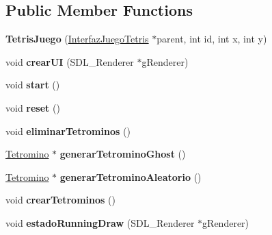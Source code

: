 \subsection*{Public Member Functions}
\begin{DoxyCompactItemize}
\item 
{\bfseries Tetris\+Juego} (\hyperlink{class_interfaz_juego_tetris}{Interfaz\+Juego\+Tetris} $\ast$parent, int id, int x, int y)\hypertarget{class_tetris_juego_a08223b09d1ae9b5eb57f05636301a6eb}{}\label{class_tetris_juego_a08223b09d1ae9b5eb57f05636301a6eb}

\item 
void {\bfseries crear\+UI} (S\+D\+L\+\_\+\+Renderer $\ast$g\+Renderer)\hypertarget{class_tetris_juego_a514937dc30a9f7bc888336a5e7052b48}{}\label{class_tetris_juego_a514937dc30a9f7bc888336a5e7052b48}

\item 
void {\bfseries start} ()\hypertarget{class_tetris_juego_a9d590db61a7cbf46eaced88e89887534}{}\label{class_tetris_juego_a9d590db61a7cbf46eaced88e89887534}

\item 
void {\bfseries reset} ()\hypertarget{class_tetris_juego_a17712a6e9e899552bb1ddc7ca2e305cc}{}\label{class_tetris_juego_a17712a6e9e899552bb1ddc7ca2e305cc}

\item 
void {\bfseries eliminar\+Tetrominos} ()\hypertarget{class_tetris_juego_a54964870a6d92ebed8ab839d0d893bd7}{}\label{class_tetris_juego_a54964870a6d92ebed8ab839d0d893bd7}

\item 
\hyperlink{class_tetromino}{Tetromino} $\ast$ {\bfseries generar\+Tetromino\+Ghost} ()\hypertarget{class_tetris_juego_a922b9d4649c4558d18227fe16337364d}{}\label{class_tetris_juego_a922b9d4649c4558d18227fe16337364d}

\item 
\hyperlink{class_tetromino}{Tetromino} $\ast$ {\bfseries generar\+Tetromino\+Aleatorio} ()\hypertarget{class_tetris_juego_ace1b43b10663450a4cba22175b65b4d1}{}\label{class_tetris_juego_ace1b43b10663450a4cba22175b65b4d1}

\item 
void {\bfseries crear\+Tetrominos} ()\hypertarget{class_tetris_juego_a1d76176a5d71faed2fb71ccdf834e909}{}\label{class_tetris_juego_a1d76176a5d71faed2fb71ccdf834e909}

\item 
void {\bfseries estado\+Running\+Draw} (S\+D\+L\+\_\+\+Renderer $\ast$g\+Renderer)\hypertarget{class_tetris_juego_aae784fd18e6326c8e5b99308a45d47b9}{}\label{class_tetris_juego_aae784fd18e6326c8e5b99308a45d47b9}


\end{DoxyCompactItemize}
